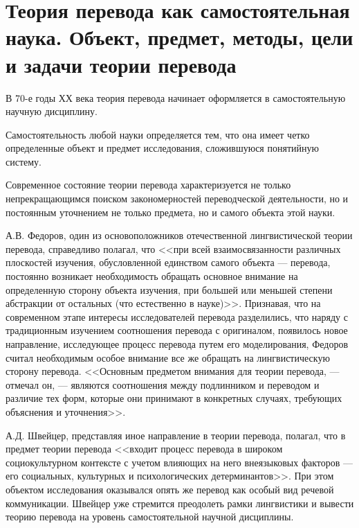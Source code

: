 \section{Теория перевода как самостоятельная наука. Объект, предмет, методы, цели и задачи теории перевода}

В 70-е годы ХХ века теория перевода начинает оформляется в самостоятельную научную дисциплину.

Самостоятельность любой науки определяется тем, что она имеет четко определенные объект и предмет исследования, сложившуюся понятийную систему. 

Современное состояние теории перевода характеризуется не только непрекращающимся поиском закономерностей переводческой деятельности, но и постоянным уточнением не только предмета, но и самого объекта этой науки.


А.В. Федоров, один из основоположников отечественной лингвистической теории перевода, справедливо полагал, что <<при всей взаимосвязанности различных плоскостей изучения, обусловленной единством самого объекта --- перевода, постоянно возникает необходимость обращать основное внимание на определенную сторону объекта изучения, при большей или меньшей степени абстракции от остальных (что естественно в науке)>>. Признавая, что на современном этапе интересы исследователей перевода разделились, что наряду с традиционным изучением соотношения перевода с оригиналом, появилось новое направление, исследующее процесс перевода путем его моделирования, Федоров считал необходимым особое внимание все же обращать на лингвистическую сторону перевода. <<Основным предметом внимания для теории перевода, --- отмечал он, --- являются соотношения между подлинником и переводом и различие тех форм, которые они принимают в конкретных случаях, требующих объяснения и уточнения>>.

А.Д. Швейцер, представляя иное направление в теории перевода, полагал, что в предмет теории перевода <<входит процесс перевода в широком социокультурном контексте с учетом влияющих на него внеязыковых факторов --- его социальных, культурных и психологических детерминантов>>. При этом объектом исследования оказывался опять же перевод как особый вид речевой коммуникации. Швейцер уже стремится преодолеть рамки лингвистики и вывести теорию перевода на уровень самостоятельной научной дисциплины.

